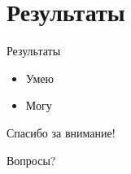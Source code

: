 \documentclass[russian, hyperref={unicode}]{beamer}
\begin{document}
\section{Результаты}

\begin{frame}{Результаты}
    \begin{itemize}
        \item Умею
        \item Могу
    \end{itemize}
\end{frame}

\begin{frame}{Спасибо за внимание!}
    \begin{center}
        \Huge
        {\color{blue} Вопросы?}
    \end{center}
\end{frame}


\end{document}
